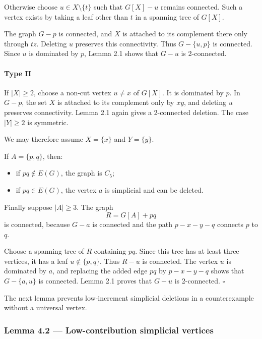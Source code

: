 \documentclass[
  11pt,
  a4paper,
]{article}
\providecommand{\tightlist}{%
  \setlength{\itemsep}{0pt}\setlength{\parskip}{0pt}}
\begin{document}
Otherwise choose \(u\in X\setminus\{t\}\) such that \(G[X]-u\) remains
connected. Such a vertex exists by taking a leaf other than \(t\) in a
spanning tree of \(G[X]\).

The graph \(G-p\) is connected, and \(X\) is attached to its complement
there only through \(tz\). Deleting \(u\) preserves this connectivity.
Thus \(G-\{u,p\}\) is connected. Since \(u\) is dominated by \(p\),
Lemma 2.1 shows that \(G-u\) is 2-connected.

\paragraph{Type II}\label{type-ii-1}

If \(|X|\ge2\), choose a non-cut vertex \(u\ne x\) of \(G[X]\). It is
dominated by \(p\). In \(G-p\), the set \(X\) is attached to its
complement only by \(xy\), and deleting \(u\) preserves connectivity.
Lemma 2.1 again gives a 2-connected deletion. The case \(|Y|\ge2\) is
symmetric.

We may therefore assume \(X=\{x\}\) and \(Y=\{y\}\).

If \(A=\{p,q\}\), then:

\begin{itemize}
\tightlist
\item
  if \(pq\notin E(G)\), the graph is \(C_5\);
\item
  if \(pq\in E(G)\), the vertex \(a\) is simplicial and can be deleted.
\end{itemize}

Finally suppose \(|A|\ge3\). The graph \[
R=G[A]+pq
\] is connected, because \(G-a\) is connected and the path \(p-x-y-q\)
connects \(p\) to \(q\).

Choose a spanning tree of \(R\) containing \(pq\). Since this tree has
at least three vertices, it has a leaf \(u\notin\{p,q\}\). Thus \(R-u\)
is connected. The vertex \(u\) is dominated by \(a\), and replacing the
added edge \(pq\) by \(p-x-y-q\) shows that \(G-\{a,u\}\) is connected.
Lemma 2.1 proves that \(G-u\) is 2-connected. \(\square\)

The next lemma prevents low-increment simplicial deletions in a
counterexample without a universal vertex.

\subsubsection{Lemma 4.2 --- Low-contribution simplicial
vertices}\label{lemma-4.2-low-contribution-simplicial-vertices}
\end{document}
